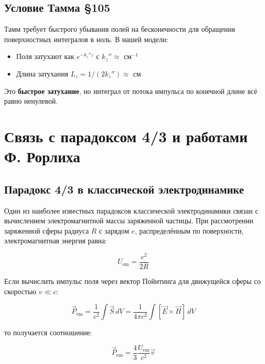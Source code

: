 \documentclass[a4paper,12pt]{article}
\begin{document}
\subsection{Условие Тамма \S 105}

Тамм \cite[\S 105]{Tamm} требует быстрого убывания полей на бесконечности для
обращения поверхностных интегралов в ноль. В нашей модели:
\begin{itemize}
    \item Поля затухают как $e^{-k_z'' z}$ с $k_z'' \approx  $ см$^{-1}$
    \item Длина затухания $L_z = 1/(2k_z'') \approx  $ см
\end{itemize}

Это \textbf{быстрое затухание}, но интеграл от потока импульса по конечной
длине всё равно ненулевой.

\section{Связь с парадоксом 4/3 и работами Ф. Рорлиха}

\subsection{Парадокс 4/3 в классической электродинамике}

Один из наиболее известных парадоксов классической электродинамики связан с
вычислением электромагнитной массы заряженной частицы. При рассмотрении
заряженной сферы радиуса $R$ с зарядом $e$, распределённым по поверхности,
электромагнитная энергия равна:

\begin{equation}
U_{\text{em}} = \frac{e^2}{2R}
\label{eq:em_energy}
\end{equation}

Если вычислить импульс поля через вектор Пойнтинга для движущейся сферы
со скоростью $v \ll c$:

\begin{equation}
\vec{P}_{\text{em}} = \frac{1}{c^2} \int \vec{S} \, dV
= \frac{1}{4\pi c^2} \int [\vec{E} \times \vec{H}] \, dV
\label{eq:poynting_momentum}
\end{equation}

то получается соотношение:

\begin{equation}
\vec{P}_{\text{em}} = \frac{4}{3} \frac{U_{\text{em}}}{c^2} \vec{v}
\label{eq:4/3_paradox}
\end{equation}
\end{document}
